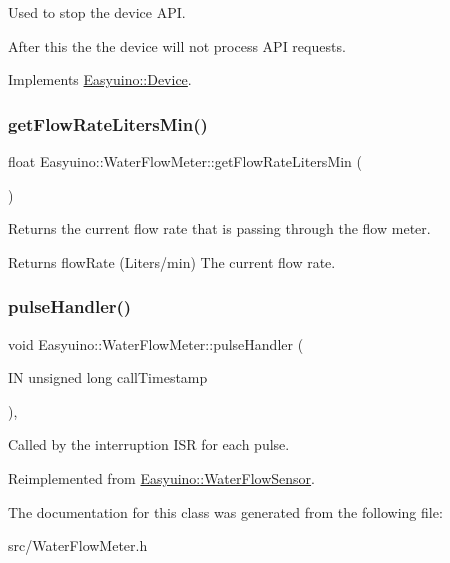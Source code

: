 Used to stop the device A\+PI. 

After this the the device will not process A\+PI requests. 

Implements \hyperlink{class_easyuino_1_1_device_ab31018ef64adc84aa2ea575b2297548f}{Easyuino\+::\+Device}.

\mbox{\label{class_easyuino_1_1_water_flow_meter_ab8d3afb56987644486dcf6e17457269d}} 
\subsubsection{\texorpdfstring{get\+Flow\+Rate\+Liters\+Min()}{getFlowRateLitersMin()}}
{\footnotesize\ttfamily float Easyuino\+::\+Water\+Flow\+Meter\+::get\+Flow\+Rate\+Liters\+Min (\begin{DoxyParamCaption}{ }\end{DoxyParamCaption})}



Returns the current flow rate that is passing through the flow meter. 

\begin{DoxyReturn}{Returns}
flow\+Rate (Liters/min) The current flow rate. 
\end{DoxyReturn}
\mbox{\label{class_easyuino_1_1_water_flow_meter_a9f9b39b7961175f027dad4fe75271569}} 
\subsubsection{\texorpdfstring{pulse\+Handler()}{pulseHandler()}}
{\footnotesize\ttfamily void Easyuino\+::\+Water\+Flow\+Meter\+::pulse\+Handler (\begin{DoxyParamCaption}\item[{IN unsigned long}]{call\+Timestamp }\end{DoxyParamCaption})\hspace{0.3cm}{\ttfamily [protected]}, {\ttfamily [virtual]}}



Called by the interruption I\+SR for each pulse. 



Reimplemented from \hyperlink{class_easyuino_1_1_water_flow_sensor_ab359b33262e324fa757de05a13f05141}{Easyuino\+::\+Water\+Flow\+Sensor}.



The documentation for this class was generated from the following file\+:\begin{DoxyCompactItemize}
\item 
src/Water\+Flow\+Meter.\+h\end{DoxyCompactItemize}
